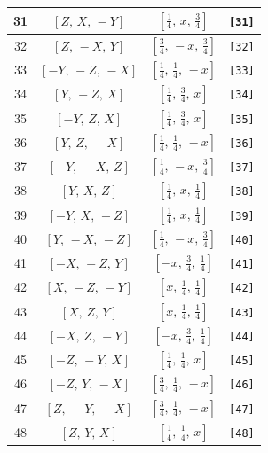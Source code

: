 \documentclass[fleqn,8pt]{jsarticle}
\begin{document}
\begin{longtable}{cccc}
31 & $\left[ Z,\, X,\, - Y \right]$ & $\left[ \frac{1}{4},\, x,\, \frac{3}{4} \right]$ & {\tt [31]} \\ \hline
32 & $\left[ Z,\, - X,\, Y \right]$ & $\left[ \frac{3}{4},\, - x,\, \frac{3}{4} \right]$ & {\tt [32]} \\ \hline
33 & $\left[ - Y,\, - Z,\, - X \right]$ & $\left[ \frac{1}{4},\, \frac{1}{4},\, - x \right]$ & {\tt [33]} \\ \hline
34 & $\left[ Y,\, - Z,\, X \right]$ & $\left[ \frac{1}{4},\, \frac{3}{4},\, x \right]$ & {\tt [34]} \\ \hline
35 & $\left[ - Y,\, Z,\, X \right]$ & $\left[ \frac{1}{4},\, \frac{3}{4},\, x \right]$ & {\tt [35]} \\ \hline
36 & $\left[ Y,\, Z,\, - X \right]$ & $\left[ \frac{1}{4},\, \frac{1}{4},\, - x \right]$ & {\tt [36]} \\ \hline
37 & $\left[ - Y,\, - X,\, Z \right]$ & $\left[ \frac{1}{4},\, - x,\, \frac{3}{4} \right]$ & {\tt [37]} \\ \hline
38 & $\left[ Y,\, X,\, Z \right]$ & $\left[ \frac{1}{4},\, x,\, \frac{1}{4} \right]$ & {\tt [38]} \\ \hline
39 & $\left[ - Y,\, X,\, - Z \right]$ & $\left[ \frac{1}{4},\, x,\, \frac{1}{4} \right]$ & {\tt [39]} \\ \hline
40 & $\left[ Y,\, - X,\, - Z \right]$ & $\left[ \frac{1}{4},\, - x,\, \frac{3}{4} \right]$ & {\tt [40]} \\ \hline
41 & $\left[ - X,\, - Z,\, Y \right]$ & $\left[ - x,\, \frac{3}{4},\, \frac{1}{4} \right]$ & {\tt [41]} \\ \hline
42 & $\left[ X,\, - Z,\, - Y \right]$ & $\left[ x,\, \frac{1}{4},\, \frac{1}{4} \right]$ & {\tt [42]} \\ \hline
43 & $\left[ X,\, Z,\, Y \right]$ & $\left[ x,\, \frac{1}{4},\, \frac{1}{4} \right]$ & {\tt [43]} \\ \hline
44 & $\left[ - X,\, Z,\, - Y \right]$ & $\left[ - x,\, \frac{3}{4},\, \frac{1}{4} \right]$ & {\tt [44]} \\ \hline
45 & $\left[ - Z,\, - Y,\, X \right]$ & $\left[ \frac{1}{4},\, \frac{1}{4},\, x \right]$ & {\tt [45]} \\ \hline
46 & $\left[ - Z,\, Y,\, - X \right]$ & $\left[ \frac{3}{4},\, \frac{1}{4},\, - x \right]$ & {\tt [46]} \\ \hline
47 & $\left[ Z,\, - Y,\, - X \right]$ & $\left[ \frac{3}{4},\, \frac{1}{4},\, - x \right]$ & {\tt [47]} \\ \hline
48 & $\left[ Z,\, Y,\, X \right]$ & $\left[ \frac{1}{4},\, \frac{1}{4},\, x \right]$ & {\tt [48]} \\
\end{longtable}
\end{document}
